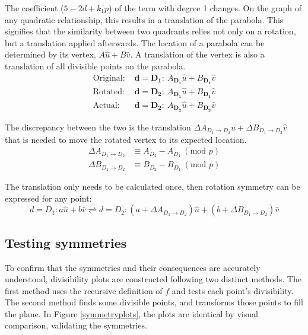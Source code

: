 \documentclass{article}
\begin{document}
The coefficient (\(5 - 2d + k_1p\)) of the term with degree 1 changes. On the graph of any quadratic relationship, this results in a translation of the parabola. This signifies that the similarity between two quadrants relies not only on a rotation, but a translation applied afterwards. The location of a parabola can be determined by its vertex, \(A\hat{u}+B\hat{v}\). A translation of the vertex is also a translation of all divisible points on the parabola.
\begin{align}
	\nonumber \text{Original: }&\mathbf{d=D_1:}\ A_{\mathbf{D_1}}\hat{u}+B_{\mathbf{D_1}}\hat{v} \\
	\nonumber \text{Rotated: }&\mathbf{d=D_2:}\ A_{\mathbf{D_1}}\hat{u}+B_{\mathbf{D_1}}\hat{v} \\
	\nonumber \text{Actual: }&\mathbf{d=D_2:}\ A_{\mathbf{D_2}}\hat{u}+B_{\mathbf{D_2}}\hat{v}
\end{align}
	
The discrepancy between the two is the translation \(\Delta A_{D_1 \rightarrow D_2}\hat{u}+\Delta B_{D_1 \rightarrow D_2}\hat{v}\) that is needed to move the rotated vertex to its expected location.
\begin{align}
	\nonumber \Delta A_{D_1 \rightarrow D_2} &\equiv A_{D_2} - A_{D_1}\ (\text{mod }p) \\
	\nonumber \Delta B_{D_1 \rightarrow D_2} &\equiv B_{D_2} - B_{D_1}\ (\text{mod }p)
\end{align}

The translation only needs to be calculated once, then rotation symmetry can be expressed for any point:
	\[d=D_1:a\hat{u}+b\hat{v} \rightleftharpoons d=D_2:(a + \Delta A_{D_1 \rightarrow D_2})\hat{u}+(b + \Delta B_{D_1 \rightarrow D_2})\hat{v}\]
	

\subsection{Testing symmetries}

To confirm that the symmetries and their consequences are accurately understood, divisibility plots are constructed following two distinct methods. The first method uses the recursive definition of \(f\) and tests each point's divisibility. The second method finds some divisible points, and transforms those points to fill the plane. In Figure \ref{symmetryplots}, the plots are identical by visual comparison, validating the symmetries.
\end{document}

